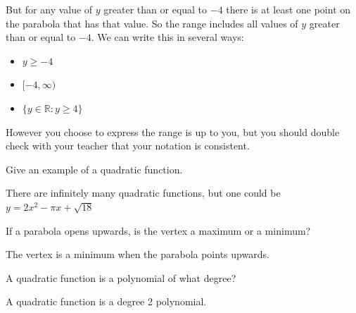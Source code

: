 \documentclass[12pt,fleqn]{book}
\newcommand{\prb}[1]{\begin{Exercise}#1\end{Exercise}}
\newcommand{\sol}[1]{\begin{Answer}#1\end{Answer}}
\begin{document}
But for any value of $y$ greater than or equal to $-4$ there is at least one point on the parabola that has that value.  So the range includes all values of $y$ greater than or equal to $-4$.  We can write this in several ways:
\begin{itemize}
	\item $y\ge -4$
	\item $[-4,\infty)$
	\item $\{y\in \mathbb R : y \ge 4\}$
\end{itemize}
However you choose to express the range is up to you, but you should double check with your teacher that your notation is consistent.
\prb{Give an example of a quadratic function.}\vspace{4em}
\sol{There are infinitely many quadratic functions, but one could be $y=2x^2-\pi x + \sqrt{18}$}
\prb{If a parabola opens upwards, is the vertex a maximum or a minimum?}\vspace{4em}
\sol{The vertex is a minimum when the parabola points upwards.}
\prb{A quadratic function is a polynomial of what degree?}
\vspace{4em}
\sol{A quadratic function is a degree 2 polynomial.}
\clearpage
\end{document}
